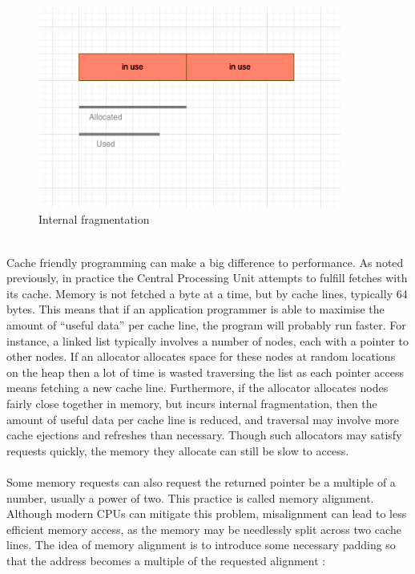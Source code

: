 \documentclass{article}
\begin{document}
\\
\begin{figure}[h]
	\centering
	\includegraphics[width=10cm]{internal_fragmentation}
	\captionsetup{width=10cm}
	\caption{Internal fragmentation}
\end{figure}
\\
Cache friendly programming can make a big difference to performance. As noted previously, in practice the Central Processing Unit attempts to fulfill fetches with its cache. Memory is not fetched a byte at a time, but by cache lines, typically 64 bytes. This means that if an application programmer is able to maximise the amount of ``useful data'' per cache line, the program will probably run faster. For instance, a linked list typically involves a number of nodes, each with a pointer to other nodes. If an allocator allocates space for these nodes at random locations on the heap then a lot of time is wasted traversing the list as each pointer access means fetching a new cache line. Furthermore, if the allocator allocates nodes fairly close together in memory, but incurs internal fragmentation, then the amount of useful data per cache line is reduced, and traversal may involve more cache ejections and refreshes than necessary. Though such allocators may satisfy requests quickly, the memory they allocate can still be slow to access.\\
\\
Some memory requests can also request the returned pointer be a multiple of a number, usually a power of two. This practice is called memory alignment. Although modern CPUs can mitigate this problem, misalignment can lead to less efficient memory access, as the memory may be needlessly split across two cache lines. The idea of memory alignment is to introduce some necessary padding so that the address becomes a multiple of the requested alignment \cite{allignment}:\\
\end{document}
